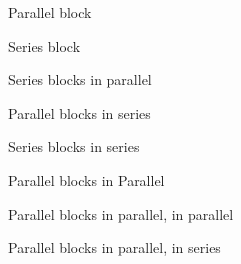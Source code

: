 \documentclass{article}
\begin{document}
\begin{figure}
\centering
{}
\caption{Parallel block}
\end{figure}


\begin{figure}
\centering
{}
\caption{Series block}
\end{figure}


\begin{figure}
\centering
\parblock
{}
{}
\caption{Series blocks in parallel}
\end{figure}

\begin{figure}
\centering
\serblock
{}
{}
\caption{Parallel blocks in series}
\end{figure}

\begin{figure}
\centering
\serblock
{}
{}
\caption{Series blocks in series}
\end{figure}


\begin{figure}
\centering
\parblock
{}
{}
\caption{Parallel blocks in Parallel}
\end{figure}

\begin{figure}
\centering
\parblock
{}
{}
\caption{Parallel blocks in parallel, in parallel}
\end{figure}

\begin{figure}
\centering
\serblock
{}
{}
\caption{Parallel blocks in parallel, in series}
\end{figure}
\end{document}

